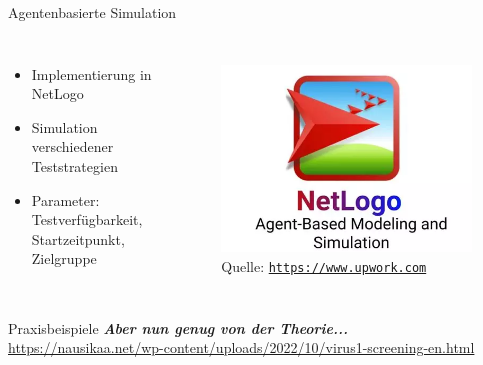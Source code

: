 \documentclass[ngerman,14pt,aspectratio=1610]{beamer}
\begin{document}
	\begin{frame}[t]{Agentenbasierte Simulation} \vspace{30pt}		
		\begin{columns}[T, onlytextwidth]
			\begin{itemize}
				\item Implementierung in NetLogo
				\item Simulation verschiedener Teststrategien
				\item Parameter: Testverfügbarkeit, Startzeitpunkt, Zielgruppe
			\end{itemize}
			
			\begin{figure}[h]
				\centering
				\includegraphics[width=\linewidth]{netlogo}
				\tiny Quelle: \href{https://www.upwork.com/services/product/development-it-a-netlogo-agent-based-simulation-model-1351194777425215488}{\texttt{https://www.upwork.com}}
			\end{figure}
			
		\end{columns}
	\end{frame}
	
	\begin{frame}[t]{Praxisbeispiele} \vspace{60pt}
		\textbf{\textit{Aber nun genug von der Theorie...}}\\
		\bigskip
		\url{https://nausikaa.net/wp-content/uploads/2022/10/virus1-screening-en.html}
	\end{frame}
	
\end{document}
